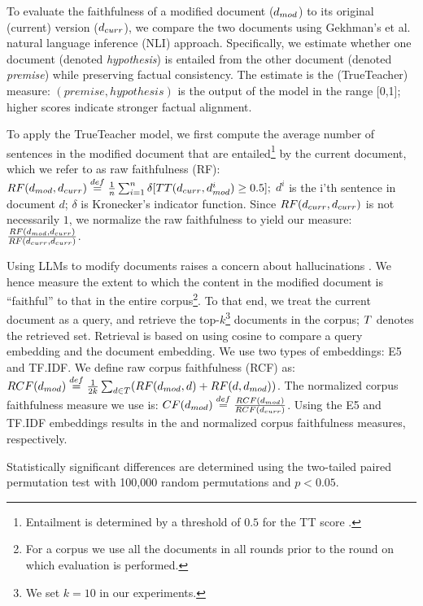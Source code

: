 To evaluate the faithfulness of a modified document ($d_{mod}$) to its
original (current) version ($d_{curr}$), we compare
the two documents using Gekhman's et al. \cite{gekhman2023trueteacher}
natural language inference (NLI) approach. Specifically, we estimate
whether one document (denoted {\em hypothesis}) is entailed from the other
document (denoted {\em premise}) while preserving factual consistency. The estimate is the \trueteacher{} (TrueTeacher)
measure: \trueteacher $(premise, hypothesis)$ is the
output of the model in the range [0,1]; higher scores indicate stronger factual alignment.

To apply the TrueTeacher model, we first compute the average number of sentences in the modified document that are entailed\footnote{Entailment is determined by a threshold of $0.5$ for the TT score \cite{gekhman2023trueteacher}.} by the current document, which we refer to as raw faithfulness (RF):
$RF(d_{mod},d_{curr}) \stackrel{def}{=} \frac{1}{n} \sum_{i=1}^n \delta[TT
  (d_{curr}, d_{mod}^{i}) \ge 0.5];$ $d^{i}$ is the i'th sentence in document $d$;
$\delta$ is Kronecker's indicator function. Since $RF(d_{curr},d_{curr})$ is not
necessarily $1$, we normalize the raw
faithfulness to yield our \firstmention{\normFaith} measure: $\frac
{RF(d_{mod},d_{curr})}{RF(d_{curr},d_{curr})}$. 

Using LLMs to modify documents raises a concern
about hallucinations \cite{shuster2021retrieval}. We hence measure the
extent to which the content in the modified document is ``faithful''
to that in the entire corpus\footnote{For a corpus we use all the
  documents in all rounds prior to the round on which evaluation is
  performed.}. To that end, we treat the current document as a query,
and retrieve the top-$k$\footnote{We set $k=10$ in our experiments.}
documents in the corpus; $T$ denotes the retrieved set. Retrieval is based on using cosine to compare a query
embedding and the document embedding. We use two types of embeddings:
E5 \cite{Wang+al:24a} and TF.IDF.  We define raw corpus faithfulness
(RCF) as: $RCF (d_{mod}) \stackrel{def}{=} \frac {1}{2k} \sum_{d \in T}
(RF(d_{mod},d) + RF (d,d_{mod}))$. The normalized corpus faithfulness
measure we use is: $CF (d_{mod}) \stackrel{def}{=}
\frac{RCF(d_{mod})}{RCF(d_{curr})}$. Using the E5 and TF.IDF embeddings results
in the \firstmention{\normCorpFaithE} and
\firstmention{\normCorpFaithT} normalized corpus faithfulness
measures, respectively.

Statistically significant differences are determined using the two-tailed paired permutation test
  with 100,000 random permutations and $p < 0.05$.

